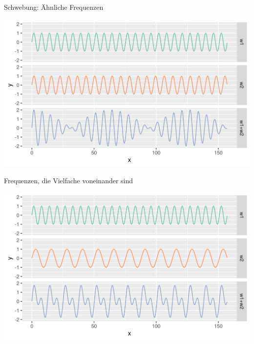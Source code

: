 \documentclass{beamer}
\begin{document}
\begin{frame}{Schwebung: Ähnliche Frequenzen}

\begin{center}
    \includegraphics[width=\textwidth]{schwebung.png}
\end{center}
    
\end{frame}

\begin{frame}{Frequenzen, die Vielfache voneinander sind}

\begin{center}
    \includegraphics[width=\textwidth]{vielfache.png}
\end{center}
    
\end{frame}
\end{document}

